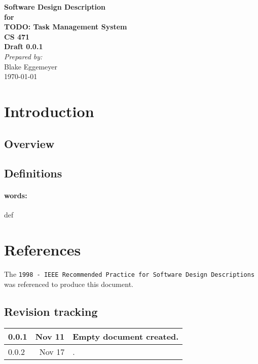 \documentclass[12pt,a4paper]{article}
\begin{document}
\begin{titlepage}
\begin{flushright} 
{\LARGE \bfseries Software Design Description}\\[1.2cm]
{\large \bfseries for}\\[1.2cm]
{\huge \bfseries TODO: Task Management System}\\[1.2cm]
{\large \bfseries CS 471}\\
\vfill
{\large \bfseries Draft 0.0.1}\\[2cm]
\emph{Prepared by:} \\
Blake Eggemeyer \\ [3cm]
{\large \today}
\end{flushright}
\end{titlepage}
\setcounter{tocdepth}{3}
\setcounter{secnumdepth}{4}
\tableofcontents
\newpage


\section{Introduction}

\subsection{Overview}

\subsection{Definitions}
\setcounter{paragraph}{0}
\paragraph{words:} def

\section{References}
The {\tt 1998 - IEEE Recommended Practice for Software Design Descriptions} was referenced to produce this document.

\subsection{Revision tracking}
\begin{tabular}{|l|r|p{5.5in}|}
\hline
0.0.1 & Nov 11 & Empty document created.\\
\hline
0.0.2 & Nov 17 & .\\
\hline
\end{tabular}
\end{document}
